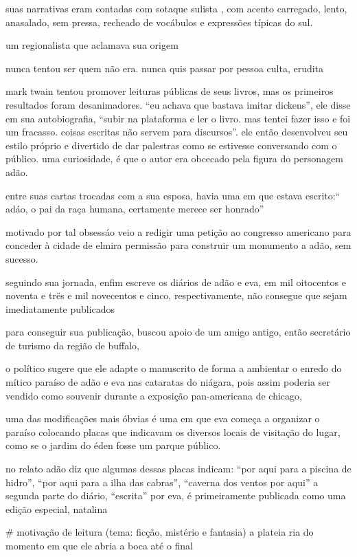 suas narrativas eram contadas com sotaque sulista , com acento carregado, lento, anasalado, sem pressa, recheado de vocábulos e expressões típicas do sul.

um regionalista que aclamava sua origem

nunca tentou ser quem não era. nunca quis passar por pessoa culta, erudita

mark twain tentou promover leituras públicas de seus livros, mas os primeiros resultados foram desanimadores. “eu achava que bastava imitar dickens”, ele disse em sua autobiografia, “subir na plataforma e ler o livro. mas tentei fazer isso e foi um fracasso. coisas escritas não servem para discursos”. ele então desenvolveu seu estilo próprio e divertido de dar palestras como se estivesse conversando com o público.
uma curiosidade, é que o autor era obcecado pela figura do personagem adão.

entre suas cartas trocadas com a sua esposa, havia uma em que estava escrito:“ adáo, o pai da raça humana, certamente merece ser honrado”

motivado por tal obsessáo veio a redigir uma petição ao congresso americano para conceder à cidade de elmira permissão para construir um monumento a adão, sem sucesso.

seguindo sua jornada, enfim escreve os diários de adão e eva, em  mil oitocentos e noventa e trës e mil novecentos e cinco, respectivamente, não consegue que sejam imediatamente publicados

para conseguir sua publicação, buscou apoio de um amigo antigo, então secretário de turismo da região de buffalo,

o político sugere que ele adapte o manuscrito de forma a ambientar o enredo do mítico paraíso de adão e eva nas cataratas do niágara, pois assim poderia ser vendido como souvenir durante a exposição pan-americana de chicago,

uma das modificações mais óbvias é uma em que eva começa a organizar o paraíso colocando placas que indicavam os diversos locais de visitação do lugar, como se o jardim do éden fosse um parque público.

no relato adão diz que algumas dessas placas indicam: “por aqui para a piscina de hidro”, “por aqui para a ilha das cabras”, “caverna dos ventos por aqui”
a segunda parte do diário, “escrita” por eva, é primeiramente publicada como uma edição especial, natalina


# motivação de leitura (tema: ficção, mistério e fantasia)
a plateia ria do momento em que ele abria a boca até o final

